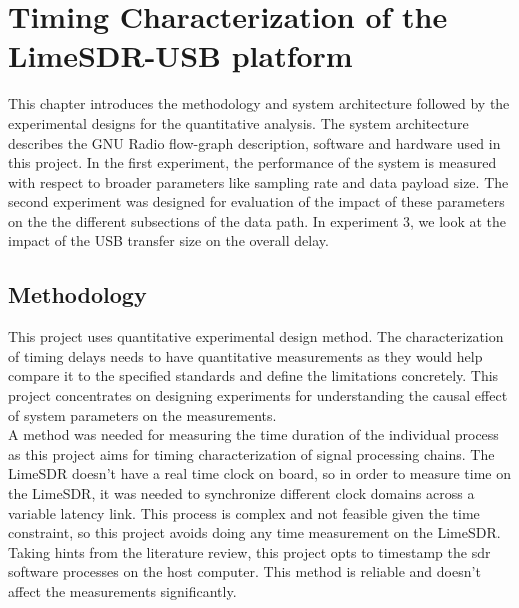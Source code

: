 \chapter{Timing Characterization of the LimeSDR-USB platform}
This chapter introduces the methodology and system architecture followed by the experimental designs for the quantitative analysis.
The system architecture describes the GNU Radio flow-graph description, software and hardware used in this project.
In the first experiment, the performance of the system is measured with respect to broader parameters like sampling rate and data payload size. The second experiment was designed for evaluation of the impact of these parameters on the the different subsections of the data path.
In experiment 3, we look at the impact of the USB transfer size on the overall delay.

\section{Methodology}
This project uses quantitative experimental design method.
The characterization of timing delays needs to have quantitative measurements as they would help compare it to the specified standards and define the limitations concretely.
This project concentrates on designing experiments for understanding the causal effect of system parameters on the measurements.\\

A method was needed for measuring the time duration of the individual process as this project aims for timing characterization of signal processing chains.
The LimeSDR doesn't have a real time clock on board, so in order to measure time on the LimeSDR, it was needed to synchronize different clock domains across a variable latency link.
This process is complex and not feasible given the time constraint, so this project avoids doing any time measurement on the LimeSDR.
Taking hints from the literature review, this project opts to timestamp the \ac{sdr} software processes on the host computer.
This method is reliable and doesn't affect the measurements significantly.\\

